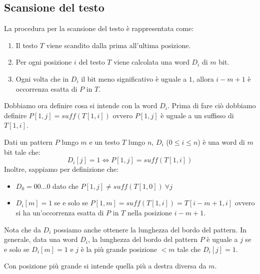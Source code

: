 \subsection{Scansione del testo}
La procedura per la scansione del testo è rappresentata come:
\begin{enumerate}
    \item Il testo $T$ viene scandito dalla prima all'ultima posizione.
    \item Per ogni posizione $i$ del testo $T$ viene calcolata una word $D_i$ di
          $m$ bit.
    \item Ogni volta che in $D_i$ il bit meno significativo è uguale a $1$, allora
          $i - m + 1$ è occorrenza esatta di $P$ in $T$.
\end{enumerate}
Dobbiamo ora definire cosa si intende con la word $D_i$. Prima di fare ciò dobbiamo
definire $P[1,j] = suff(T[1,i])$ ovvero $P[1,j]$ è uguale a un suffisso di $T[1,i]$.
\begin{definizione} \label{def:word}
    Dati un pattern $P$ lungo $m$ e un testo $T$ lungo $n$, $D_i$ ($0 \leq i \leq
        n$) è una word di $m$ bit tale che:
    \begin{equation}
        D_i[j] = 1 \iff P[1,j] = suff(T[1,i])
    \end{equation}
    Inoltre, sappiamo per definizione che:
    \begin{itemize}
        \item $D_0 = 00\dots0$ dato che $P[1, j] \neq suff(T[1, 0]) \ \forall j$
        \item $D_i[m] = 1$ se e solo se $P[1, m] = suff(T[1, i]) = T[i - m + 1,
                          i]$ ovvero si ha un'occorrenza esatta di $P$ in $T$
              nella posizione $i - m + 1$.
    \end{itemize}
\end{definizione}
\begin{nota}
    Nota che da $D_i$ possiamo anche ottenere la lunghezza del bordo del pattern.
    In generale, data una word $D_i$, la lunghezza del bordo del pattern $P$ è
    uguale a $j$ se e solo se $D_i[m] = 1$ e $j$ è la più grande posizione $< m$
    tale che $D_i[j] = 1$.

    Con posizione più grande si intende quella più a destra diversa da $m$.
\end{nota}
